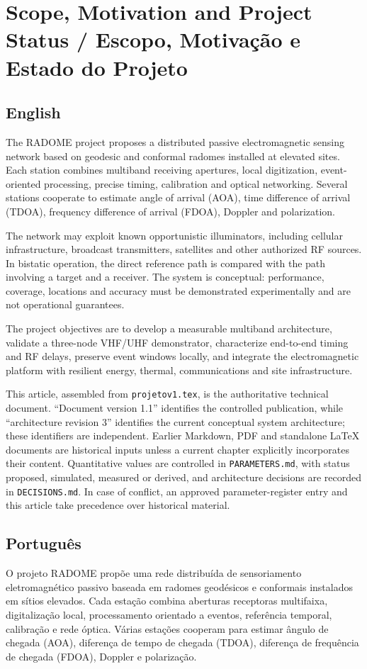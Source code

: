 \chapter{Scope, Motivation and Project Status / Escopo, Motivação e Estado do Projeto}

\section*{English}
The RADOME project proposes a distributed passive electromagnetic sensing network based on geodesic and conformal radomes installed at elevated sites. Each station combines multiband receiving apertures, local digitization, event-oriented processing, precise timing, calibration and optical networking. Several stations cooperate to estimate angle of arrival (AOA), time difference of arrival (TDOA), frequency difference of arrival (FDOA), Doppler and polarization.

The network may exploit known opportunistic illuminators, including cellular infrastructure, broadcast transmitters, satellites and other authorized RF sources. In bistatic operation, the direct reference path is compared with the path involving a target and a receiver. The system is conceptual: performance, coverage, locations and accuracy must be demonstrated experimentally and are not operational guarantees.

The project objectives are to develop a measurable multiband architecture, validate a three-node VHF/UHF demonstrator, characterize end-to-end timing and RF delays, preserve event windows locally, and integrate the electromagnetic platform with resilient energy, thermal, communications and site infrastructure.

This article, assembled from \texttt{projetov1.tex}, is the authoritative technical document. ``Document version 1.1'' identifies the controlled publication, while ``architecture revision 3'' identifies the current conceptual system architecture; these identifiers are independent. Earlier Markdown, PDF and standalone LaTeX documents are historical inputs unless a current chapter explicitly incorporates their content. Quantitative values are controlled in \texttt{PARAMETERS.md}, with status proposed, simulated, measured or derived, and architecture decisions are recorded in \texttt{DECISIONS.md}. In case of conflict, an approved parameter-register entry and this article take precedence over historical material.

\section*{Português}
O projeto RADOME propõe uma rede distribuída de sensoriamento eletromagnético passivo baseada em radomes geodésicos e conformais instalados em sítios elevados. Cada estação combina aberturas receptoras multifaixa, digitalização local, processamento orientado a eventos, referência temporal, calibração e rede óptica. Várias estações cooperam para estimar ângulo de chegada (AOA), diferença de tempo de chegada (TDOA), diferença de frequência de chegada (FDOA), Doppler e polarização.

